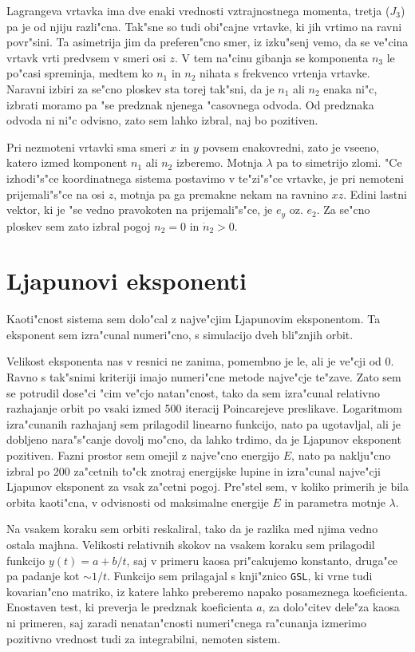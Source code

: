 \documentclass[a4paper,10pt]{article}
\begin{document}
Lagrangeva vrtavka ima dve enaki vrednosti vztrajnostnega momenta, tretja ($J_3$) pa je od njiju razli"cna. Tak"sne so tudi obi"cajne vrtavke, ki jih vrtimo na ravni povr"sini. Ta asimetrija jim da preferen"cno smer, iz izku"senj vemo, da se ve"cina vrtavk vrti predvsem v smeri osi $z$. V tem na"cinu gibanja se komponenta $n_3$ le po"casi spreminja, medtem ko $n_1$ in $n_2$ nihata s frekvenco vrtenja vrtavke. Naravni izbiri za se"cno ploskev sta torej tak"sni, da je $n_1$ ali $n_2$ enaka ni"c, izbrati moramo pa "se predznak njenega "casovnega odvoda. Od predznaka odvoda ni ni"c odvisno, zato sem lahko izbral, naj bo pozitiven. 

Pri nezmoteni vrtavki sma smeri $x$ in $y$ povsem enakovredni, zato je vseeno, katero izmed komponent $n_1$ ali $n_2$ izberemo. Motnja $\lambda$ pa to simetrijo zlomi. "Ce izhodi"s"ce koordinatnega sistema postavimo v te"zi"s"ce vrtavke, je pri nemoteni prijemali"s"ce na osi $z$, motnja pa ga premakne nekam na ravnino $xz$. Edini lastni vektor, ki je "se vedno pravokoten na prijemali"s"ce, je $e_y$ oz. $e_2$. Za se"cno ploskev sem zato izbral pogoj $n_2 = 0$ in $\dot n_2 > 0$. 

\section{Ljapunovi eksponenti}

Kaoti"cnost sistema sem dolo"cal z najve"cjim Ljapunovim eksponentom. Ta eksponent sem izra"cunal numeri"cno, s simulacijo dveh bli"znjih orbit. 

Velikost eksponenta nas v resnici ne zanima, pomembno je le, ali je ve"cji od 0. Ravno s tak"snimi kriteriji imajo numeri"cne metode najve"cje te"zave. Zato sem se potrudil dose"ci "cim ve"cjo natan"cnost, tako da sem izra"cunal relativno razhajanje orbit po vsaki izmed 500 iteracij Poincarejeve preslikave. Logaritmom izra"cunanih razhajanj sem prilagodil linearno funkcijo, nato pa ugotavljal, ali je dobljeno nara"s"canje dovolj mo"cno, da lahko trdimo, da je Ljapunov eksponent pozitiven. Fazni prostor sem omejil z najve"cno energijo $E$, nato pa naklju"cno izbral po 200 za"cetnih to"ck znotraj energijske lupine in izra"cunal najve"cji Ljapunov eksponent za vsak za"cetni pogoj. Pre"stel sem, v koliko primerih je bila orbita kaoti"cna, v odvisnosti od maksimalne energije $E$ in parametra motnje $\lambda$.

Na vsakem koraku sem orbiti reskaliral, tako da je razlika med njima vedno ostala majhna. Velikosti relativnih skokov na vsakem koraku sem prilagodil funkcijo $y(t) = a+b/t$, saj v primeru kaosa pri"cakujemo konstanto, druga"ce pa padanje kot $\sim 1/t$. Funkcijo sem prilagajal s knji"znico \texttt{GSL}, ki vrne tudi kovarian"cno matriko, iz katere lahko preberemo napako posameznega koeficienta. Enostaven test, ki preverja le predznak koeficienta $a$, za dolo"citev dele"za kaosa ni primeren, saj zaradi nenatan"cnosti numeri"cnega ra"cunanja izmerimo pozitivno vrednost tudi za integrabilni, nemoten sistem.
\end{document}
